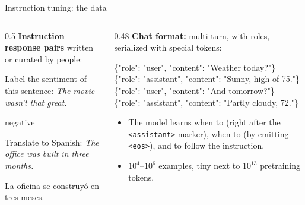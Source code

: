 \begin{frame}{Instruction tuning: the data}
\begin{columns}[T]
\begin{column}{0.5\textwidth}
\textbf{Instruction--response pairs} written or curated by people:
\begin{userbox}Label the sentiment of this sentence: \emph{The movie wasn't that great.}\end{userbox}
\begin{modelbox}negative\end{modelbox}
\begin{userbox}Translate to Spanish: \emph{The office was built in three months.}\end{userbox}
\begin{modelbox}La oficina se construy\'o en tres meses.\end{modelbox}
\end{column}
\begin{column}{0.48\textwidth}
\textbf{Chat format:} multi-turn, with roles, serialized with special tokens:
\begin{tcolorbox}[colback=softgray,colframe=softgray!60!black,boxrule=0.4pt,arc=3pt,left=5pt,right=5pt,top=3pt,bottom=3pt,fontupper=\scriptsize\ttfamily]
\{"role": "user", "content": "Weather today?"\}\\
\{"role": "assistant", "content": "Sunny, high of 75."\}\\
\{"role": "user", "content": "And tomorrow?"\}\\
\{"role": "assistant", "content": "Partly cloudy, 72."\}
\end{tcolorbox}
\begin{itemize}\setlength{\itemsep}{3pt}
  \item The model learns when to  (right after the \texttt{<assistant>} marker), when to  (by emitting \texttt{<eos>}), and to follow the instruction.
  \item $10^4$--$10^6$ examples, tiny next to $10^{13}$ pretraining tokens.
\end{itemize}
\end{column}
\end{columns}
\end{frame}

